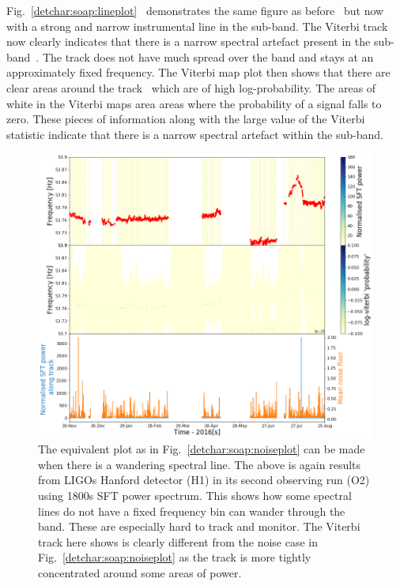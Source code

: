 Fig.~\ref{detchar:soap:lineplot}~
demonstrates the same figure as before~ but now with a strong and narrow
instrumental line in the sub-band.  The Viterbi track now clearly indicates
that there is a narrow spectral artefact present in the
sub-band~. The track
does not have much spread over the band and stays at an approximately fixed
frequency.  The Viterbi map plot then shows that there are clear areas around
the track~ which are of high log-probability. The areas of white in the Viterbi
maps area areas where the probability of a signal falls to zero.  These pieces
of information along with the large value of the Viterbi statistic indicate
that there is a narrow spectral artefact within the sub-band.~ 

%
\begin{figure}
	\centering
	\includegraphics[width=\textwidth]{C5_detchar/track_F53_7_53_9_wander.png}
	\caption[Example SOAP output for wandering line.]{The equivalent plot as in Fig.~\ref{detchar:soap:noiseplot} can be made when there is a wandering spectral line. The above is again results from \glspl{LIGO} Hanford detector (H1) in its second observing run (O2) using 1800s \gls{SFT} power spectrum. This shows how some spectral lines do not have a fixed frequency bin can wander through the band. These are especially hard to track and monitor. The Viterbi track here shows is clearly different from the noise case in Fig.~\ref{detchar:soap:noiseplot} as the track is more tightly concentrated around some areas of power. }
	\label{detchar:soap:wanderplot}
\end{figure}
%

